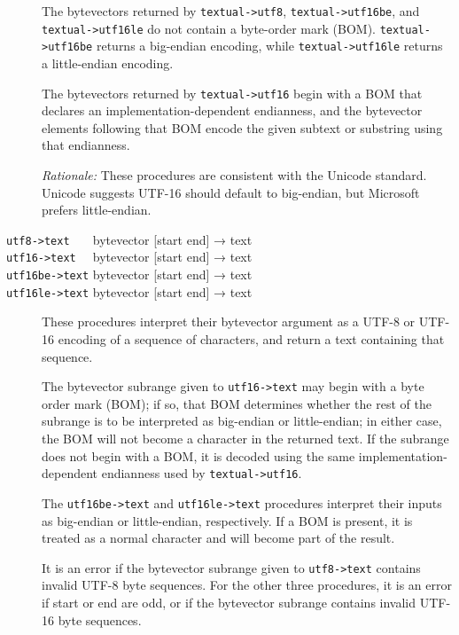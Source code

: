 \begin{description}
The bytevectors returned by \texttt{textual-\textgreater{}utf8},
\texttt{textual-\textgreater{}utf16be}, and
\texttt{textual-\textgreater{}utf16le} do not contain a byte-order mark
(BOM). \texttt{textual-\textgreater{}utf16be} returns a big-endian
encoding, while \texttt{textual-\textgreater{}utf16le} returns a
little-endian encoding.

The bytevectors returned by \texttt{textual-\textgreater{}utf16} begin
with a BOM that declares an implementation-dependent endianness, and the
bytevector elements following that BOM encode the given subtext or
substring using that endianness.

\emph{Rationale:} These procedures are consistent with the Unicode
standard. Unicode suggests UTF-16 should default to big-endian, but
Microsoft prefers little-endian.
\item[ \href{}{} \href{}{} \href{}{} \href{}{}
\texttt{utf8-\textgreater{}text~~~} bytevector {[}start end{]} → text\\
\texttt{utf16-\textgreater{}text~~} bytevector {[}start end{]} → text\\
\texttt{utf16be-\textgreater{}text} bytevector {[}start end{]} → text\\
\texttt{utf16le-\textgreater{}text} bytevector {[}start end{]} → text ]
These procedures interpret their bytevector argument as a UTF-8 or
UTF-16 encoding of a sequence of characters, and return a text
containing that sequence.

The bytevector subrange given to \texttt{utf16-\textgreater{}text} may
begin with a byte order mark (BOM); if so, that BOM determines whether
the rest of the subrange is to be interpreted as big-endian or
little-endian; in either case, the BOM will not become a character in
the returned text. If the subrange does not begin with a BOM, it is
decoded using the same implementation-dependent endianness used by
\texttt{textual-\textgreater{}utf16}.

The \texttt{utf16be-\textgreater{}text} and
\texttt{utf16le-\textgreater{}text} procedures interpret their inputs as
big-endian or little-endian, respectively. If a BOM is present, it is
treated as a normal character and will become part of the result.

It is an error if the bytevector subrange given to
\texttt{utf8-\textgreater{}text} contains invalid UTF-8 byte sequences.
For the other three procedures, it is an error if start or end are odd,
or if the bytevector subrange contains invalid UTF-16 byte sequences.
\end{description}

